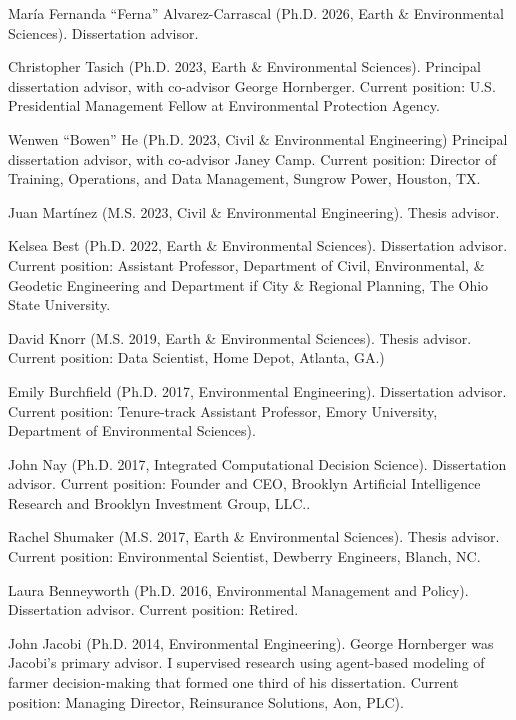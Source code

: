 \item Mar\'{i}a Fernanda ``Ferna'' Alvarez-Carrascal
  (Ph.D. 2026, Earth \& Environmental Sciences).
  Dissertation advisor.
\item Christopher Tasich (Ph.D. 2023, Earth \& Environmental Sciences).
  Principal dissertation advisor, with co-advisor George Hornberger.
  Current position: U.S. Presidential Management Fellow at Environmental
  Protection Agency.
\item Wenwen ``Bowen'' He (Ph.D. 2023, Civil \& Environmental Engineering)
  Principal dissertation advisor, with co-advisor Janey Camp.
  Current position: Director of Training, Operations, and Data Management,
  Sungrow Power, Houston, TX.
\item Juan Mart\'inez (M.S. 2023, Civil \& Environmental Engineering).
  Thesis advisor.
\item Kelsea Best (Ph.D. 2022, Earth \& Environmental Sciences).
  Dissertation advisor.
  Current position: Assistant Professor, Department of Civil, Environmental, \& Geodetic
  Engineering and Department if City \& Regional Planning,
  The Ohio State University.
\item David Knorr (M.S. 2019, Earth \& Environmental Sciences).
  Thesis advisor.
  Current position: Data Scientist, Home Depot, Atlanta, GA.)
\item Emily Burchfield (Ph.D. 2017, Environmental Engineering).
  Dissertation advisor.
  Current position: Tenure-track Assistant Professor, Emory University, Department of Environmental Sciences).
\item John Nay (Ph.D. 2017, Integrated Computational Decision Science).
  Dissertation advisor.
  Current position: Founder and CEO, Brooklyn Artificial Intelligence Research and Brooklyn Investment Group, LLC..
\item Rachel Shumaker (M.S. 2017, Earth \& Environmental Sciences).
  Thesis advisor.
  Current position: Environmental Scientist, Dewberry Engineers, Blanch, NC.
\item Laura Benneyworth (Ph.D. 2016, Environmental Management and Policy).
  Dissertation advisor.
  Current position: Retired.
\item John Jacobi (Ph.D. 2014, Environmental Engineering).
  George Hornberger was Jacobi's primary advisor.
  I supervised research using agent-based modeling of farmer decision-making that formed one third of his dissertation.
  Current position: Managing Director, Reinsurance Solutions, Aon, PLC).

